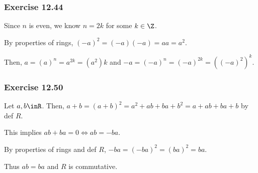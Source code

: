 \documentclass{article}
\begin{document}
\subsubsection*{Exercise 12.44}
Since \( n \) is even, we know \( n = 2k \) for some \( k \in \Z \).

By properties of rings, \( (-a)^2 = (-a)(-a) = aa = a^2 \).

Then, \( a = (a)^n = a^{2k} = (a^2)k\) and \( -a = (-a)^n = (-a)^{2k} = ((-a)^2)^k \).

\subsubsection*{Exercise 12.50}
Let \( a,b \inR \). Then, \( a+b = (a+b)^2 = a^2 + ab + ba + b^2 = a + ab + ba + b\) by def \( R \).

This implies \( ab + ba = 0 \iff ab = -ba \).

By properties of rings and def \( R \), \( -ba = (-ba)^2 = (ba)^2 = ba \).

Thus \( ab=ba \) and \( R \) is commutative.
\end{document}
